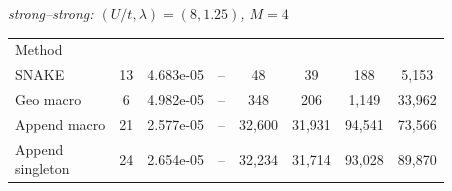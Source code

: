 \documentclass[
  reprint,
  amsmath,
  amssymb,
  aps,
  pra,
  nofootinbib,
  superscriptaddress,
  floatfix
]{revtex4-2}
\newcommand{\twq}{\mathrm{2Q}}
\newcommand{\metrichead}[1]{\makebox[0.061\textwidth][c]{#1}}
\begin{document}
\noindent\begin{minipage}{\columnwidth}
\begin{center}
\scriptsize
\setlength{\tabcolsep}{0.70pt}
\renewcommand{\arraystretch}{1.0}
\textit{strong--strong: $(U/t,\lambda)=(8,1.25)$, \(M=4\)}
\par\smallskip
\begin{ruledtabular}
\begin{tabular}{p{}ccccccc}
Method & \metrichead{$k_{\rm pl}$} & \metrichead{$|\Delta E|$} & \metrichead{$1-F$} & \metrichead{$N_{\twq}$} & \metrichead{$D_{\twq}$} & \metrichead{$D_c$} & \metrichead{$S$}\\
\colrule
SNAKE & 13 & 4.683e-05 & -- & 48 & 39 & 188 & 5,153 \\
Geo macro & 6 & 4.982e-05 & -- & 348 & 206 & 1,149 & 33,962 \\
Append macro & 21 & 2.577e-05 & -- & 32,600 & 31,931 & 94,541 & 73,566 \\
\shortstack[l]{Append\\singleton} & 24 & 2.654e-05 & -- & 32,234 & 31,714 & 93,028 & 89,870 \\
\end{tabular}
\end{ruledtabular}
\end{center}
\end{minipage}
\par\addvspace{0.45ex}
\par\addvspace{1.0ex}
\clearpage
\end{document}
